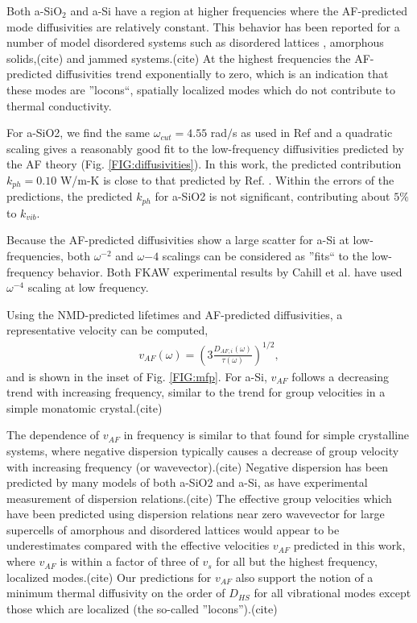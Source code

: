 \documentclass[aps,prb,onecolumn,preprint,superscriptaddress,footinbib,amsmath,amssymb,floatfix]{revtex4}
\begin{document}
Both a-SiO$_2$ and a-Si have a region at higher frequencies where the 
AF-predicted mode diffusivities are relatively constant. This behavior 
has been reported for a number of model disordered systems such as 
disordered lattices
\cite{sheng_heat_1991,beltukov_ioffe-regel_2013,larkin_predicting_2013}, 
amorphous solids,(cite) and jammed systems.(cite) At the highest 
frequencies the AF-predicted 
diffusivities trend exponentially to zero, which is an indication 
that these modes are ''locons``, spatially localized modes which 
do not contribute to thermal conductivity.
\cite{allen_diffusons_1999,garber_numerical_2001} 

For a-SiO2, we find the same $\omega_{cut} = 4.55$ rad$/$s as used in 
Ref  and a quadratic scaling 
gives a reasonably good fit 
to the low-frequency diffusivities predicted by the AF theory 
(Fig. \ref{FIG:diffusivities}). 
In this work, the predicted contribution $k_{ph} =0.10$ W/m-K is 
close to that predicted by Ref. . Within 
the errors of the predictions, the predicted $k_{ph}$ for a-SiO2 
is not significant, contributing about $5\%$ to $k_{vib}$. 

Because the AF-predicted diffusivities show a large scatter 
for a-Si at low-frequencies, both 
$\omega^{-2}$ and $\omega{-4}$ scalings can be considered as 
''fits`` to the low-frequency behavior. Both FKAW  
experimental results by Cahill et al. have used $\omega^{-4}$ scaling 
at low frequency.

Using the NMD-predicted lifetimes and AF-predicted diffusivities, a 
representative velocity can be computed, 
\begin{equation}\label{EQ:vAF}
\begin{split}
v_{AF}(\omega) = \left(3\frac{D_{AF,i}(\omega)}{\tau(\omega)}\right)^{1/2},
\end{split}
\end{equation}
and is shown in the inset of Fig. \ref{FIG:mfp}. 
For a-Si, $v_{AF}$ follows a 
decreasing trend with increasing frequency, similar to the trend 
for group velocities in a simple monatomic crystal.(cite) 

The dependence of $v_{AF}$ in frequency is similar to that found for 
simple crystalline systems, where negative dispersion typically 
causes a decrease of group velocity with increasing frequency (or 
wavevector).(cite) Negative dispersion has been predicted by many 
models of both a-SiO2 and a-Si,\cite{ruocco_relaxation_2000} 
as have experimental measurement of 
dispersion relations.(cite) The effective group velocities 
which have been predicted using dispersion relations near zero 
wavevector for large supercells of amorphous\cite{he_thermal_2011,he_heat_2011} 
and disordered lattices\cite{hori_phonon_2013} would appear to 
be underestimates 
compared with the effective velocities $v_{AF}$ predicted in this work, 
where $v_{AF}$ is within a factor of three of $v_s$ for all but the 
highest frequency, localized modes.(cite) Our predictions for 
$v_{AF}$ also support the notion of a minimum thermal diffusivity 
on the order of $D_{HS}$ for all vibrational modes except   
those which are localized (the so-called ''locons'').(cite) 
\end{document}
